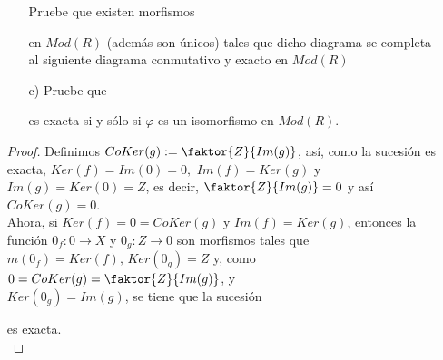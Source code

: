 \documentclass{article}
\begin{document}
\begin{enumerate}[label=\textbf{Ej \arabic*.}]
\begin{itemize}
\begin{center}
\end{center}
Pruebe que existen morfismos
en $Mod(R)$ (además son únicos) tales que dicho diagrama se completa al siguiente diagrama conmutativo y exacto en $Mod(R)$
\begin{center}
\end{center}

\item[c)] Pruebe que 
es exacta si y sólo si $\varphi$ es un isomorfismo en $Mod(R)$.
\end{itemize}
\begin{proof} 
 Definimos $CoKer(g):=\faktor{Z}{Im(g)}$, así, como la sucesión es exacta, $Ker(f)=Im(0)=0,\,\,Im(f)=Ker(g)$ y \\
$Im(g)=Ker(0)=Z$, es decir, $\faktor{Z}{Im(g)}=0$ y así $CoKer(g)=0$.\\

Ahora, si $Ker(f)=0=CoKer(g)$ y $Im(f)=Ker(g)$, entonces la función $0_f\colon 0\longrightarrow X$ y $0_g\colon Z\longrightarrow 0$ son
morfismos tales que\\ $m(0_f)=Ker(f),\, Ker(0_g)=Z$ y, como $0=CoKer(g)=\faktor{Z}{Im(g)}$, y\\$Ker(0_g)=Im(g)$, se tiene que la sucesión 
es exacta.\\


\end{proof}
\end{enumerate}
\end{document}
